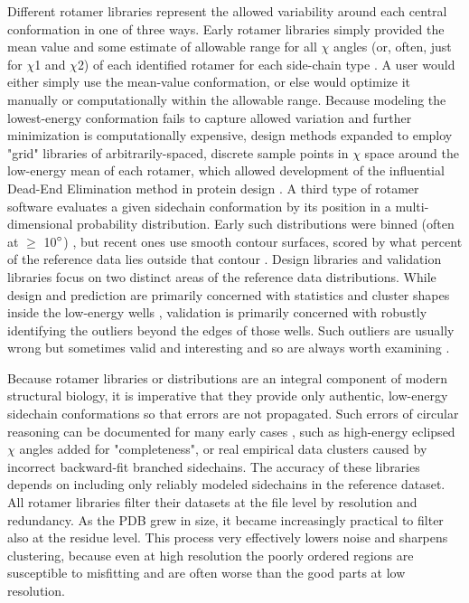Different rotamer libraries represent the allowed variability around each central conformation in one of three ways. Early rotamer libraries simply provided the mean value and some estimate of allowable range for all $\chi$ angles (or, often, just for $\chi$1 and $\chi$2) of each identified rotamer for each side-chain type \cite{Ponder1987, Tuffery1991,Schrauber1993}.  A user would either simply use the mean-value conformation, or else would optimize it manually or computationally within the allowable range. Because modeling the lowest-energy conformation fails to capture allowed variation and further minimization is computationally expensive, design methods expanded to employ "grid" libraries of arbitrarily-spaced, discrete sample points in $\chi$ space around the low-energy mean of each rotamer, which allowed development of the influential Dead-End Elimination method in protein design \cite{DeMaeyer1997,Gainza2013}.  A third type of rotamer software \cite{Dunbrack1997, Chen:2010kx} evaluates a given sidechain conformation by its position in a multi-dimensional probability distribution. Early such distributions were binned (often at $\ge$ 10$\degree$) \cite{Laskowski:gl0276}, but recent ones use smooth contour surfaces, scored by what percent of the reference data lies outside that contour \cite{lovell2000penultimate, Read2011}. \textcolor{changecolor}{Design libraries and validation libraries focus on two distinct areas of the reference data distributions. While design and prediction are primarily concerned with statistics and cluster shapes inside the low-energy wells \cite{Dunbrack1997}, validation is primarily concerned with robustly identifying the outliers beyond the edges of those wells. Such outliers are usually wrong but sometimes valid and interesting and so are always worth examining \cite{Richardson2013}.}

Because rotamer libraries or distributions are an integral component of modern structural biology, it is imperative that they provide only authentic, low-energy sidechain conformations so that errors are not propagated. Such errors of circular reasoning can be documented for many early cases \cite{lovell2000penultimate}, such as high-energy eclipsed $\chi$ angles added for "completeness", or real empirical data clusters caused by incorrect backward-fit branched sidechains. The accuracy of these libraries depends on including only reliably modeled sidechains in the reference dataset. All rotamer libraries filter their datasets at the file level by resolution and redundancy. As the PDB grew in size, it  became increasingly practical to filter also at the residue level. This process very effectively lowers noise and sharpens clustering, because even at high resolution the poorly ordered regions are susceptible to misfitting and are often worse than the good parts at low resolution.

